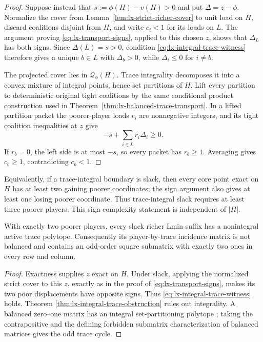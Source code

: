 \begin{proof}
Suppose instead that $s:=\phi(H)-v(H)>0$ and put $\Delta=z-\phi$.
Normalize the cover from Lemma~\ref{lem:lx-strict-richer-cover} to unit load
on $H$, discard coalitions disjoint from $H$, and write $c_i<1$ for its loads
on $L$.  The argument proving \eqref{eq:lx-transport-signs}, applied to this
chosen $z$, shows that $\Delta_L$ has both signs.  Since
$\Delta(L)=s>0$, condition \eqref{eq:lx-integral-trace-witness} therefore
gives a unique $b\in L$ with $\Delta_b>0$, while
$\Delta_i\leq0$ for $i\ne b$.

The projected cover lies in $\mathcal Q_\phi(H)$.  Trace integrality
decomposes it into a convex mixture of integral points, hence set partitions
of $H$.  Lift every partition to deterministic original tight coalitions by
the same conditional product construction used in
Theorem~\ref{thm:lx-balanced-trace-transport}.  In a lifted partition packet
the poorer-player loads $r_i$ are nonnegative integers, and its tight
coalition inequalities at $z$ give
\[
 -s+\sum_{i\in L}r_i\Delta_i\geq0.                  \tag{IT-P}
 \label{eq:lx-integral-trace-packet}
\]
If $r_b=0$, the left side is at most $-s$, so every packet has $r_b\geq1$.
Averaging gives $c_b\geq1$, contradicting $c_b<1$.
\end{proof}

Equivalently, if a trace-integral boundary is slack, then every core point
exact on $H$ has at least two gaining poorer coordinates; the sign argument
also gives at least one losing poorer coordinate.  Thus trace-integral slack
requires at least three poorer players.  This sign-complexity statement is
independent of $|H|$.

\begin{corollary}
\label{cor:lx-odd-trace-cycle}
With exactly two poorer players, every slack richer Lmin suffix has a
nonintegral active trace polytope.  Consequently its player-by-trace incidence
matrix is not balanced and contains an odd-order square submatrix with exactly
two ones in every row and column.
\end{corollary}

\begin{proof}
Exactness supplies $z$ exact on $H$.  Under slack,
applying the normalized strict cover to this $z$, exactly as in the proof of
\eqref{eq:lx-transport-signs}, makes its two poor displacements have opposite
signs.  Thus \eqref{eq:lx-integral-trace-witness} holds.  Theorem
\ref{thm:lx-integral-trace-obstruction} rules out integrality.  A balanced
zero--one matrix has an integral set-partitioning polytope
\citep{Berge1972}; taking the contrapositive and the defining forbidden
submatrix characterization of balanced matrices gives the odd trace cycle.
\end{proof}

